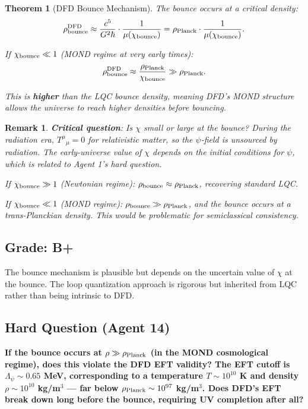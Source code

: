 \documentclass[11pt,a4paper]{article}
\newtheorem{theorem}{Theorem}
\newtheorem{remark}{Remark}
\begin{document}
\begin{theorem}[DFD Bounce Mechanism]
The bounce occurs at a critical density:
\begin{equation}
\rho_{\rm bounce}^{\rm DFD} \approx \frac{c^5}{G^2\hbar}\cdot\frac{1}{\mu(\chi_{\rm bounce})} = \rho_{\rm Planck}\cdot\frac{1}{\mu(\chi_{\rm bounce})}.
\end{equation}

If $\chi_{\rm bounce} \ll 1$ (MOND regime at very early times):
\begin{equation}
\rho_{\rm bounce}^{\rm DFD} \approx \frac{\rho_{\rm Planck}}{\chi_{\rm bounce}} \gg \rho_{\rm Planck}.
\end{equation}

This is \textbf{higher} than the LQC bounce density, meaning DFD's MOND structure allows the universe to reach higher densities before bouncing.
\end{theorem}

\begin{remark}
\textbf{Critical question}: Is $\chi$ small or large at the bounce? During the radiation era, $T^\mu{}_\mu = 0$ for relativistic matter, so the $\psi$-field is unsourced by radiation. The early-universe value of $\chi$ depends on the initial conditions for $\psi$, which is related to Agent 1's hard question.

If $\chi_{\rm bounce} \gg 1$ (Newtonian regime): $\rho_{\rm bounce} \approx \rho_{\rm Planck}$, recovering standard LQC.

If $\chi_{\rm bounce} \ll 1$ (MOND regime): $\rho_{\rm bounce} \gg \rho_{\rm Planck}$, and the bounce occurs at a trans-Planckian density. This would be problematic for semiclassical consistency.
\end{remark}

\subsection{Grade: B+}

The bounce mechanism is plausible but depends on the uncertain value of $\chi$ at the bounce. The loop quantization approach is rigorous but inherited from LQC rather than being intrinsic to DFD.

\subsection{Hard Question (Agent 14)}

\textbf{If the bounce occurs at $\rho \gg \rho_{\rm Planck}$ (in the MOND cosmological regime), does this violate the DFD EFT validity? The EFT cutoff is $\Lambda_\psi \sim 0.65$ MeV, corresponding to a temperature $T \sim 10^{10}$ K and density $\rho \sim 10^{10}$ kg/m$^3$ --- far below $\rho_{\rm Planck} \sim 10^{97}$ kg/m$^3$. Does DFD's EFT break down long before the bounce, requiring UV completion after all?}
\end{document}
